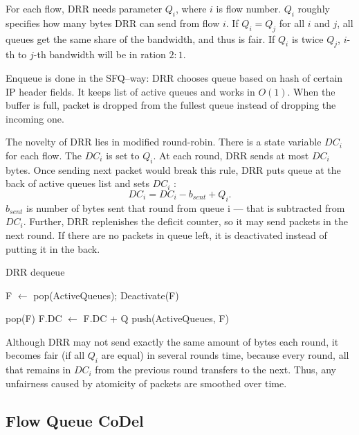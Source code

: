 For each flow, DRR needs parameter $Q_i$, where $i$ is flow number. $Q_i$ roughly specifies how many bytes DRR can send from flow $i$. If $Q_i = Q_j$ for all $i$ and $j$, all queues get the same share of the bandwidth, and thus is fair. If $Q_i$ is twice $Q_j$, $i$-th to $j$-th bandwidth will be in ration $2:1$.

Enqueue is done in the SFQ--way: DRR chooses queue based on hash of certain IP header fields. It keeps list of active queues and works in $O(1)$. When the buffer is full, packet is dropped from the fullest queue instead of dropping the incoming one.

The novelty of DRR lies in modified round-robin. There is a state variable $DC_i$ for each flow. The $DC_i$ is set to $Q_i$. At each round, DRR sends at most $DC_i$ bytes. Once sending next packet would break this rule, DRR puts queue  at the back of active queues list and sets $DC_i$ :
\[
  DC_i = DC_i - b_{sent} + Q_i.
\]
$b_{sent}$ is number of bytes sent that round from queue i --- that is subtracted from $DC_i$. Further, DRR replenishes the deficit counter, so it may send packets in the next round. If there are no packets in queue left, it is deactivated instead of putting it in the back.

\begin{algorithm}
	\caption{DRR dequeue}
	\label{alg01:DRR_deq}
	\begin{algorithmic}
			\State F $\leftarrow$ pop(ActiveQueues);
				\State Deactivate(F)
				
					\State \Return pop(F)
			\Else {}
				\State F.DC $\leftarrow$ F.DC + Q
				\State push(ActiveQueues, F)
			\EndIf
		\EndWhile
	\end{algorithmic}
\end{algorithm}

Although DRR may not send exactly the same amount of bytes each round, it becomes fair (if all $Q_i$ are equal) in several rounds time, because every round, all that remains in $DC_i$ from the previous round transfers to the next. Thus, any unfairness caused by atomicity of packets are smoothed over time.


\subsection{Flow Queue CoDel}

